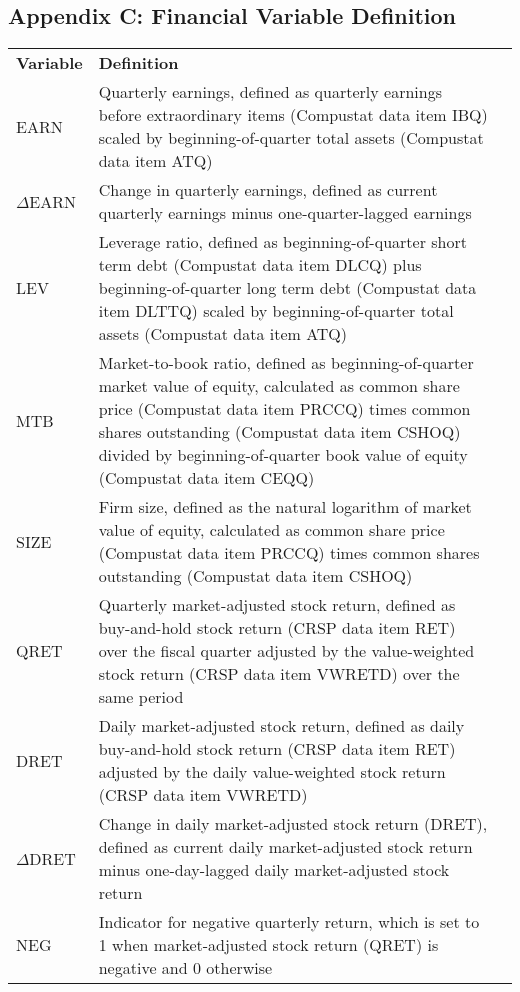 \subsection*{Appendix C: Financial Variable Definition}
\label{appc}
\begin{table}[H]
	\centering
	\begin{tabular}{lp{15cm}p{15cm}}
		\textbf{Variable} & \textbf{Definition} \\
		
		EARN & Quarterly earnings, defined as quarterly earnings before extraordinary items (Compustat data item IBQ) scaled by beginning-of-quarter total assets (Compustat data item ATQ) \\
		$\Delta$EARN & Change in quarterly earnings, defined as current quarterly earnings minus one-quarter-lagged earnings \\
		LEV & Leverage ratio, defined as beginning-of-quarter short term debt (Compustat data item DLCQ) plus beginning-of-quarter long term debt (Compustat data item DLTTQ) scaled by beginning-of-quarter total assets (Compustat data item ATQ) \\
		MTB & Market-to-book ratio, defined as beginning-of-quarter market value of equity, calculated as common share price (Compustat data item PRCCQ) times common shares outstanding (Compustat data item CSHOQ) divided by beginning-of-quarter book value of equity (Compustat data item CEQQ) \\
		SIZE & Firm size, defined as the natural logarithm of market value of equity, calculated as common share price (Compustat data item PRCCQ) times common shares outstanding (Compustat data item CSHOQ) \\
		QRET & Quarterly market-adjusted stock return, defined as buy-and-hold stock return (CRSP data item RET) over the fiscal quarter adjusted by the value-weighted stock return (CRSP data item VWRETD) over the same period \\
		DRET & Daily market-adjusted stock return, defined as daily buy-and-hold stock return (CRSP data item RET) adjusted by the daily value-weighted stock return (CRSP data item VWRETD)\\
		$\Delta$DRET & Change in daily market-adjusted stock return (DRET), defined as current daily market-adjusted stock return minus one-day-lagged daily market-adjusted stock return \\
		NEG & Indicator for negative quarterly return, which is set to 1 when market-adjusted stock return (QRET) is negative and 0 otherwise \\

\end{tabular}
\end{table}
